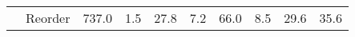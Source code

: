 \begin{tabular}{llrrrrrrrr}
       & Reorder &                    737.0 &             1.5 &                                            27.8 &                                              7.2 &                                              66.0 &                                                8.5 &   29.6 &   35.6 \\

\end{tabular}
